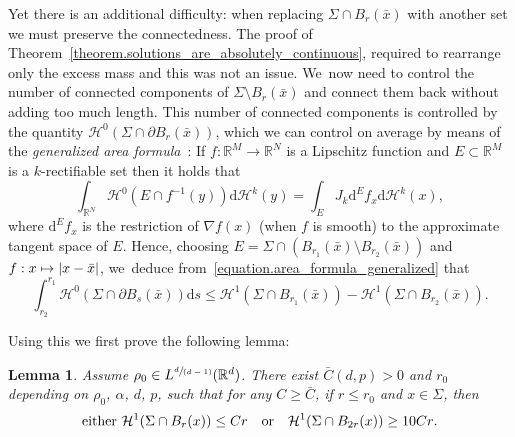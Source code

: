 \documentclass[10pt]{amsart}
\newcommand\mto{\mathchoice{\longmapsto}{\mapsto}{\mapsto}{\mapsto}}
\newcommand{\spfrac}[2]{\sfrac{#1}{(#2)}}
\newtheorem{lemma}[theorem]{Lemma}
\theoremstyle{definition}
\newcommand\cH{\mathcal{H}}
\newcommand{\RR}{\mathbb{R}}
\newcommand\dd{\mathrm{d}}
\begin{document}
Yet there is an additional difficulty: when replacing $\Sigma \cap B_r(\bar x)$ with
another set we must preserve the connectedness.
The proof of Theorem~\ref{theorem.solutions_are_absolutely_continuous}, required to rearrange only the excess mass
and this was not an issue. We~now need to control the number of connected components
of $\Sigma \setminus B_r(\bar x)$ and connect them back without adding
too much length.
This number of connected components is controlled by the
quantity \hbox{$\cH^0(\Sigma\cap\partial B_r(\bar x))$}, which we can control on average
by means of the \emph{generalized area formula}~\cite[Th.\,2.91]{ambrosio2000functions}: If $f:\RR^M \to \RR^N$ is a Lipschitz function and $E\subset \RR^M$ is a $k$-rectifiable set then it holds that
\begin{equation}
\label{equation.area_formula_generalized}
\int_{\RR^N} \cH^0(E \cap f^{-1}(y))\dd\cH^k(y)
=
\int_{E} J_k\dd^Ef_x \dd\cH^k(x),
\end{equation}
where $\dd^Ef_x$ is the restriction of $\nabla f(x)$ (when $f$ is smooth) to the approximate tangent space of $E$.
Hence, choosing $E = \Sigma \cap (B_{r_1}(\bar x) \setminus B_{r_2}(\bar x))$ and $f : x \mto |x - \bar x|$, we~deduce from~\eqref{equation.area_formula_generalized} that
\begin{equation}\label{equation.area_formula_generalized_inequality}
\int_{r_2}^{r_1} \cH^0(\Sigma \cap \partial B_s(\bar x))\dd s
\le
\cH^1(\Sigma \cap B_{r_1}(\bar x)) - \cH^1(\Sigma \cap B_{r_2}(\bar x)).
\end{equation}

Using this we first prove the following lemma:
\begin{lemma}\label{lemma.ahlfors}
Assume $\rho_0\in L^{\spfrac{d}{d-1}}(\RR^d)$.
There exist $\bar C(d,p)>0$ and $r_0$ depending on $\rho_0$, $\alpha$, $d$, $p$, such
that for any $C\ge \bar C$, if $r\le r_0$ and $x\in \Sigma$,
then
\[
\text{either $\cH^1(\Sigma\cap B_r(x))\le Cr$\quad or\quad $\cH^1(\Sigma\cap B_{2r}(x))\ge 10Cr$.}
\]

\end{lemma}
\end{document}
